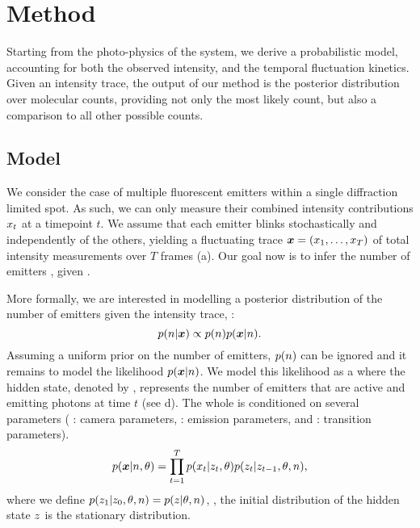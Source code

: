 \section{Method}

Starting from the photo-physics of the system, we derive a probabilistic model,
accounting for both the observed intensity, and the temporal fluctuation
kinetics.
  Given an intensity trace, the output of our method \ours is the posterior
  distribution over molecular counts, providing not only the most likely count,
  but also a comparison to all other possible counts. 

\subsection{Model}

We consider the case of multiple fluorescent emitters within a single
diffraction limited spot.
%
  As such, we can only measure their combined intensity contributions
  $x_{t}$ at a timepoint $t$.
  We assume that each emitter blinks stochastically and independently of the
  others, yielding a fluctuating trace $\bm{x} = (x_{1},\ldots,x_{T})$ of total
  intensity measurements over $T$ frames (a).
  Our goal now is to infer the number of emitters \n, given \trace.

More formally, we are interested in modelling a posterior distribution of the
number of emitters given the intensity trace, \ie:
  \begin{equation*}
    p(n | \bm{x}) \propto p(n) p(\bm{x} | n)
    \text{.}
  \end{equation*}
  Assuming a uniform prior on the number of emitters, $p(n)$ can be ignored
  and it remains to model the likelihood $p(\bm{x}|n)$.
  We model this likelihood as a \hmm where the hidden state, denoted by ,
  represents the number of emitters that are active and emitting photons at
  time $t$ (see d).
  The whole \hmm is conditioned on several parameters \parameters (
    \parametersc: camera parameters, \parameterse: emission parameters, 
    and \parameterst: transition parameters).
  \begin{equation}
    p(\bm{x}| n, \theta) =
      \prod_{t=1}^{T}
        p(x_{t} | z_{t}, \theta)
        p(z_{t} | z_{t-1}, \theta, n)
    \text{,}
    \label{eq:method:HMM}
  \end{equation}
  where we define $p(z_{1}|z_{0},\theta,n)=p(z_{}|\theta,n)$, \ie,
  the initial distribution of the hidden state $z_{}$ is the stationary
  distribution.

